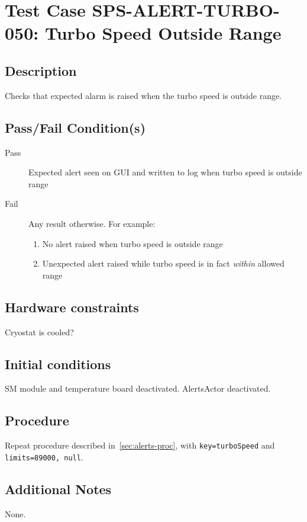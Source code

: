 \section{Test Case SPS-ALERT-TURBO-050: Turbo Speed Outside Range}

\subsection{Description}

Checks that expected alarm is raised when the turbo speed is outside range.

\subsection{Pass/Fail Condition(s)}

\begin{description}
\item [Pass] Expected alert seen on GUI and written to log when turbo speed is outside range
\item [Fail] Any result otherwise. For example:

\begin{enumerate}
    \item No alert raised when turbo speed is outside range
    \item Unexpected alert raised while turbo speed is in fact {\it within} allowed range
\end{enumerate}
\end{description}

\subsection{Hardware constraints}

Cryostat is cooled?

\subsection{Initial conditions}

SM module and temperature board deactivated. AlertsActor deactivated.

\subsection{Procedure}

Repeat procedure described in~\ref{sec:alerts-proc}, with \texttt{key=turboSpeed} and \texttt{limits=89000, 
null}.

\subsection{Additional Notes}
None.
